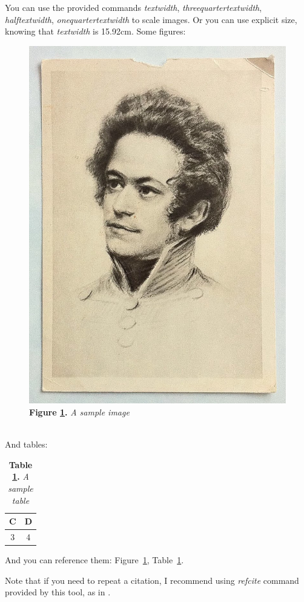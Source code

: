 You can use the provided commands \textit{textwidth}, \textit{threequartertextwidth}, \textit{halftextwidth}, \textit{onequartertextwidth} to scale images.
Or you can use explicit size, knowing that \textit{textwidth} is 15.92cm.
Some figures:
\begin{figure}[H]
	\centering
	\includegraphics[width=\halftextwidth]{../resources/sample-image.png}
	\caption{\textbf{Figure \ref{fig:sample}.} \textit{A sample image}}
	\label{fig:sample}
\end{figure}

\\
And tables:
\begin{table}[H]
	\centering
	\caption{\textbf{Table \ref{tab:sample}.} \textit{A sample table}}
	\begin{tabular}{|c|c|}
		\hline
		C & D \\ \hline
		3 & 4 \\ \hline
	\end{tabular}
	\label{tab:sample}
\end{table}

And you can reference them: Figure~\ref{fig:sample}, Table~\ref{tab:sample}.

Note that if you need to repeat a citation, I recommend using \textit{refcite} command provided by this tool, as in .


